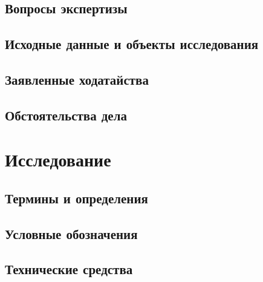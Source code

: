 \documentclass[a4paper,12pt]{article}
\begin{document}
\thispagestyle{empty}  %








  


\subsection{Вопросы экспертизы}


\subsection{Исходные данные и объекты исследования}


\subsection{Заявленные ходатайства}


\subsection{Обстоятельства дела}


\printbibliography


\section{Исследование}

\subsection{Термины и определения}


\subsection{Условные обозначения}


\subsection{Технические средства}


%


%
%

%
%
\end{document}
